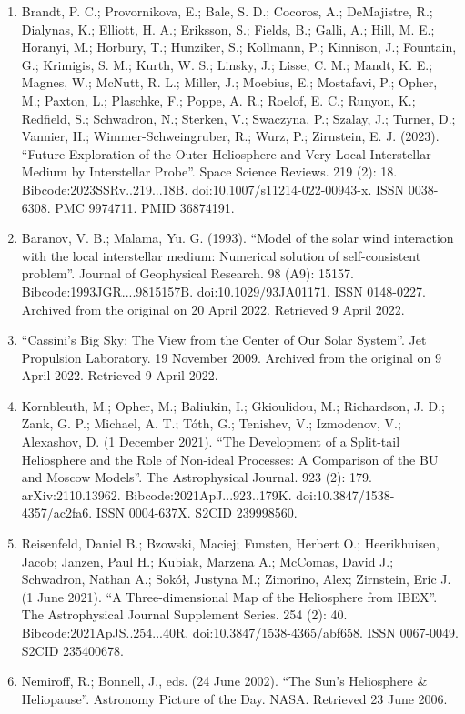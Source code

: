 \begin{enumerate}
\item Brandt, P. C.; Provornikova, E.; Bale, S. D.; Cocoros, A.; DeMajistre, R.; Dialynas, K.; Elliott, H. A.; Eriksson, S.; Fields, B.; Galli, A.; Hill, M. E.; Horanyi, M.; Horbury, T.; Hunziker, S.; Kollmann, P.; Kinnison, J.; Fountain, G.; Krimigis, S. M.; Kurth, W. S.; Linsky, J.; Lisse, C. M.; Mandt, K. E.; Magnes, W.; McNutt, R. L.; Miller, J.; Moebius, E.; Mostafavi, P.; Opher, M.; Paxton, L.; Plaschke, F.; Poppe, A. R.; Roelof, E. C.; Runyon, K.; Redfield, S.; Schwadron, N.; Sterken, V.; Swaczyna, P.; Szalay, J.; Turner, D.; Vannier, H.; Wimmer-Schweingruber, R.; Wurz, P.; Zirnstein, E. J. (2023). ``Future Exploration of the Outer Heliosphere and Very Local Interstellar Medium by Interstellar Probe''. Space Science Reviews. 219 (2): 18. Bibcode:2023SSRv..219...18B. doi:10.1007/s11214-022-00943-x. ISSN 0038-6308. PMC 9974711. PMID 36874191.
\item Baranov, V. B.; Malama, Yu. G. (1993). ``Model of the solar wind interaction with the local interstellar medium: Numerical solution of self-consistent problem''. Journal of Geophysical Research. 98 (A9): 15157. Bibcode:1993JGR....9815157B. doi:10.1029/93JA01171. ISSN 0148-0227. Archived from the original on 20 April 2022. Retrieved 9 April 2022.
\item ``Cassini's Big Sky: The View from the Center of Our Solar System''. Jet Propulsion Laboratory. 19 November 2009. Archived from the original on 9 April 2022. Retrieved 9 April 2022.
\item Kornbleuth, M.; Opher, M.; Baliukin, I.; Gkioulidou, M.; Richardson, J. D.; Zank, G. P.; Michael, A. T.; Tóth, G.; Tenishev, V.; Izmodenov, V.; Alexashov, D. (1 December 2021). ``The Development of a Split-tail Heliosphere and the Role of Non-ideal Processes: A Comparison of the BU and Moscow Models''. The Astrophysical Journal. 923 (2): 179. arXiv:2110.13962. Bibcode:2021ApJ...923..179K. doi:10.3847/1538-4357/ac2fa6. ISSN 0004-637X. S2CID 239998560.
\item Reisenfeld, Daniel B.; Bzowski, Maciej; Funsten, Herbert O.; Heerikhuisen, Jacob; Janzen, Paul H.; Kubiak, Marzena A.; McComas, David J.; Schwadron, Nathan A.; Sokół, Justyna M.; Zimorino, Alex; Zirnstein, Eric J. (1 June 2021). ``A Three-dimensional Map of the Heliosphere from IBEX''. The Astrophysical Journal Supplement Series. 254 (2): 40. Bibcode:2021ApJS..254...40R. doi:10.3847/1538-4365/abf658. ISSN 0067-0049. S2CID 235400678.
\item Nemiroff, R.; Bonnell, J., eds. (24 June 2002). ``The Sun's Heliosphere \& Heliopause''. Astronomy Picture of the Day. NASA. Retrieved 23 June 2006.

\end{enumerate}
